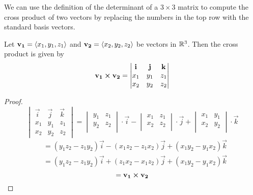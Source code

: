 \documentclass[handout]{ximera}
\begin{document}
 We can use the definition of the determinant of a $3 \times 3$ matrix to compute the cross product of two 
 vectors by replacing the numbers in the top row with the standard basis vectors.
 
 \begin{proposition} 
 Let  $\mathbf{v_1} = \left\langle x_1, y_1, z_1\right\rangle$ and $\mathbf{v_2} = \left\langle x_2, y_2, z_2\right\rangle$ be vectors in $\mathbb R^3$. 
 Then the cross product is given by
 \[
\mathbf{v_1} \boldsymbol\times \mathbf{v_2} = 
 \begin{vmatrix}
\mathbf{i} & \mathbf{j} & \mathbf{k}\\
x_1 & y_1 & z_1\\
x_2 & y_2 & z_2
\end{vmatrix} 
\]

\end{proposition}


\begin{proof}
\[
 \begin{vmatrix}
\vec{i} & \vec{j} & \vec{k}\\
x_1 & y_1 & z_1\\
x_2 & y_2 & z_2
\end{vmatrix} 
= \begin{vmatrix}
 y_1 & z_1  \\
 y_2 & z_2 \\
 \end{vmatrix} \cdot \vec i
 - \begin{vmatrix}
 x_1 & z_1  \\
 x_2 & z_2 \\
 \end{vmatrix} \cdot \vec j
 + \begin{vmatrix}
 x_1 & y_1  \\
 x_2 & y_2 \\
 \end{vmatrix} \cdot \vec k
 \]
 \begin{align*}
 &= (y_1z_2 - z_1y_2) \vec{i} - (x_1z_2-z_1x_2) \vec{j} + (x_1y_2 - y_1x_2) \vec{k}\\
 &=(y_1z_2 - z_1y_2) \vec{i} + (z_1x_2 - x_1z_2) \vec{j} + (x_1y_2 - y_1x_2) \vec{k}
 \end{align*}
\[
 = \mathbf{v_1} \boldsymbol\times \mathbf{v_2}
\]
\end{proof}
\end{document}
